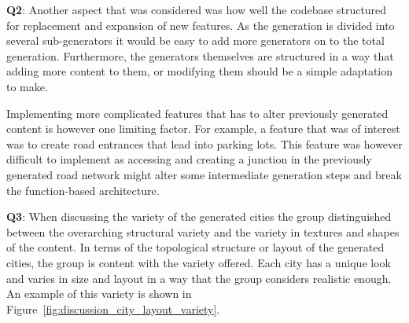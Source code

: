 \textbf{Q2}:
Another aspect that was considered was how well the codebase structured for replacement and expansion of new features.
As the generation is divided into several sub-generators it would be easy to add more generators on to the total generation.
Furthermore, the generators themselves are structured in a way that adding more content to them, or modifying them should be a simple adaptation to make. 

Implementing more complicated features that has to alter previously generated content is however one limiting factor.
For example, a feature that was of interest was to create road entrances that lead into parking lots.
This feature was however difficult to implement as accessing and creating a junction in the previously generated road network might alter some intermediate generation steps and break the function-based architecture.

\textbf{Q3}:
When discussing the variety of the generated cities the group distinguished between the overarching structural variety and the variety in textures and shapes of the content.
In terms of the topological structure or layout of the generated cities, the group is content with the variety offered.
Each city has a unique look and varies in size and layout in a way that the group considers realistic enough.
An example of this variety is shown in Figure~\ref{fig:discussion_city_layout_variety}.

